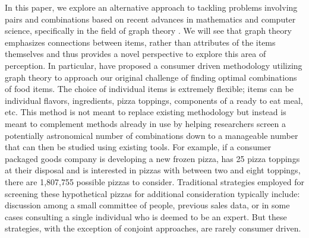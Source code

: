 In this paper, we explore an alternative approach to tackling problems involving pairs and combinations based on recent advances in mathematics and computer science, specifically in the field of graph theory \citep{Ennisa,Ennis2010,Ennis2011}.   We will see that graph theory emphasizes connections between items, rather than attributes of the items themselves and thus provides a novel perspective to explore this area of perception.  In particular, \citet{Ennis2010} have proposed a consumer driven methodology utilizing graph theory to approach our original challenge of finding optimal combinations of food items.  The choice of individual items is extremely flexible; items can be individual flavors, ingredients, pizza toppings, components of a ready to eat meal, etc.  This method is not meant to replace existing methodology but instead is meant to complement methods already in use by helping researchers screen a potentially astronomical number of combinations down to a manageable number that can then be studied using existing tools.  For example, if a consumer packaged goods company is developing a new frozen pizza, has 25 pizza toppings at their disposal and is interested in pizzas with  between two and eight toppings, there are 1,807,755 possible pizzas to consider.  Traditional strategies employed for screening these hypothetical pizzas for additional consideration typically include: discussion among a small committee of people, previous sales data, or in some cases consulting a single individual who is deemed to be an expert.  But these strategies, with the exception of conjoint approaches, are rarely consumer driven.

